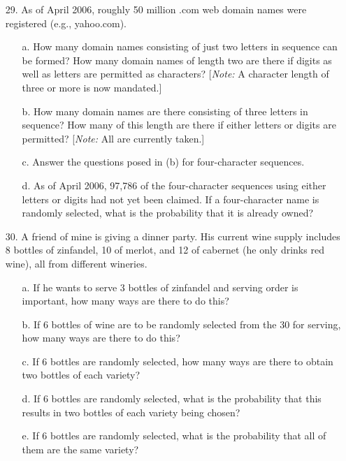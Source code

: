 \documentclass[letterpaper,12pt]{article}
\begin{document}
\maketitle

\begin{enumerate}
  \item[29.]
    As of April 2006, roughly 50 million .com web domain names were registered (e.g., yahoo.com).
    \begin{enumerate}
      \item[a.]
        How many domain names consisting of just two letters in sequence can be formed? How many domain names of length two are there if digits as well as letters are permitted as characters? [\textit{Note:} A character length of three or more is now mandated.]
      \item[b.]
        How many domain names are there consisting of three letters in sequence? How many of this length are there if either letters or digits are permitted? [\textit{Note:} All are currently taken.]
      \item[c.]
        Answer the questions posed in (b) for four-character sequences.
      \item[d.]
        As of April 2006, 97,786 of the four-character sequences using either letters or digits had not yet been claimed. If a four-character name is randomly selected, what is the probability that it is already owned?
    \end{enumerate}
  \item[30.]
    A friend of mine is giving a dinner party. His current wine supply includes 8 bottles of zinfandel, 10 of merlot, and 12 of cabernet (he only drinks red wine), all from different wineries.
    \begin{enumerate}
      \item[a.]
        If he wants to serve 3 bottles of zinfandel and serving order is important, how many ways are there to do this?
      \item[b.]
        If 6 bottles of wine are to be randomly selected from the 30 for serving, how many ways are there to do this?
      \item[c.]
        If 6 bottles are randomly selected, how many ways are there to obtain two bottles of each variety?
      \item[d.]
        If 6 bottles are randomly selected, what is the probability that this results in two bottles of each variety being chosen?
      \item[e.]
        If 6 bottles are randomly selected, what is the probability that all of them are the same variety?

\end{enumerate}
\end{enumerate}
\end{document}
